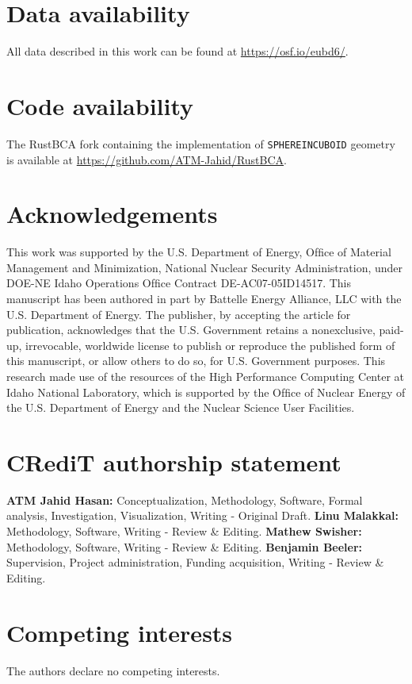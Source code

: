 \documentclass[review]{elsarticle}
\begin{document}
\section{Data availability}

All data described in this work can be found at \url{https://osf.io/eubd6/}.


\section{Code availability}

The RustBCA fork containing the implementation of \texttt{SPHEREINCUBOID} geometry is available at \url{https://github.com/ATM-Jahid/RustBCA}.


\section{Acknowledgements}

This work was supported by the U.S. Department of Energy, Ofﬁce of Material Management and Minimization, National Nuclear Security Administration, under DOE-NE Idaho Operations Ofﬁce Contract DE-AC07-05ID14517. This manuscript has been authored in part by Battelle Energy Alliance, LLC with the U.S. Department of Energy. The publisher, by accepting the article for publication, acknowledges that the U.S. Government retains a nonexclusive, paid-up, irrevocable, worldwide license to publish or reproduce the published form of this manuscript, or allow others to do so, for U.S. Government purposes. This research made use of the resources of the High Performance Computing Center at Idaho National Laboratory, which is supported by the Ofﬁce of Nuclear Energy of the U.S. Department of Energy and the Nuclear Science User Facilities.


\section{CRediT authorship statement}

\textbf{ATM Jahid Hasan:} Conceptualization, Methodology, Software, Formal analysis, Investigation, Visualization, Writing - Original Draft.
\textbf{Linu Malakkal:} Methodology, Software, Writing - Review \& Editing.
\textbf{Mathew Swisher:} Methodology, Software, Writing - Review \& Editing.
\textbf{Benjamin Beeler:} Supervision, Project administration, Funding acquisition, Writing - Review \& Editing.


\section{Competing interests}

The authors declare no competing interests.




\end{document}

